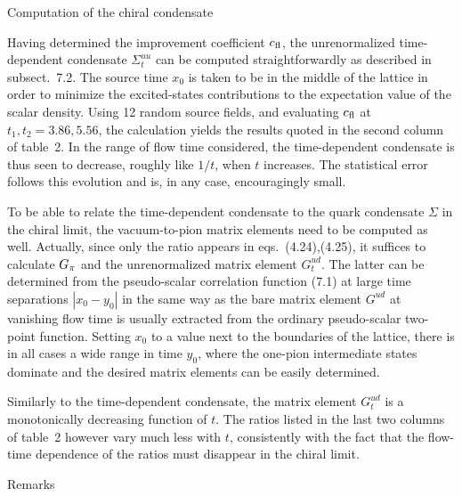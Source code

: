  
 Computation of the chiral condensate

Having determined the improvement coefficient $c_{\rm fl}$, the unrenormalized
time-de\-pen\-dent 
condensate $\Sigma^{uu}_t$ can be computed straightforwardly
as described in subsect.~7.2.
The source time $x_0$ is taken to 
be in the middle of the lattice in order to minimize 
the excited-states contributions to the expectation value of
the scalar density. 
Using 12 random source fields, and evaluating
$c_{\rm fl}$ at $t_1,t_2=3.86,5.56$, the calculation yields the results
quoted in the second column of table~2. 
In the range of flow time considered,
the time-dependent 
condensate is thus seen to decrease, roughly like $1/t$, 
when $t$ increases. The statistical error follows this
evolution and is, in any case, encouragingly small. 



To be able to relate the time-dependent condensate to the 
quark condensate $\Sigma$ in the chiral limit,
the vacuum-to-pion matrix elements 
need to be computed as well. Actually, since only the ratio
appears in eqs.~(4.24),(4.25), it suffices to calculate $G_{\pi}$ 
and the unrenormalized matrix element $G^{ud}_t$. The 
latter can be determined from
the pseudo-scalar correlation function (7.1) at 
large time separations $|x_0-y_0|$ in the same way as
the bare matrix element $G^{ud}$ at vanishing flow time 
is usually extracted from the ordinary pseudo-scalar two-point function.
Setting $x_0$ to a value next to the boundaries of the lattice, 
there is in all cases a wide range in time $y_0$, 
where the one-pion intermediate states dominate
and the desired matrix elements can be easily determined.

Similarly to the time-dependent condensate, the matrix element
$G^{ud}_t$ is a monotonically decreasing function of $t$.
The ratios listed in the last two columns of table~2 however
vary much less with $t$, consistently with
the fact that the flow-time dependence of the ratios must disappear
in the chiral limit.


 Remarks


